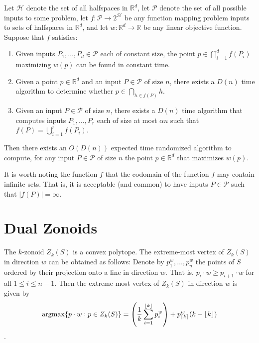 \documentclass[lotsofwhite]{patmorin}
\newcommand{\argmax}{\mathrm{argmax}}
\begin{document}
\begin{thm}[Chan 2004]
Let $\mathcal{H}$ denote the set of all halfspaces in $\mathbb{R}^d$,
let $\mathcal{P}$ denote the set of all possible inputs to some problem, 
let $f:\mathcal{P}\rightarrow 2^{\mathcal{H}}$ be any function mapping 
problem inputs to sets of halfspaces in $\mathbb{R}^d$,
and let $w:\mathbb{R}^d\rightarrow \mathbb{R}$ be
any linear objective function.  Suppose that $f$ satisfies:
\begin{enumerate}

\item Given inputs $P_1,\ldots,P_d\in\mathcal{P}$ each of constant
size, the point $p\in\bigcap_{i=1}^d f(P_i)$ maximizing $w(p)$ can be
found in constant time.

\item Given a point $p\in\mathbb{R}^d$ and an input $P\in\mathcal{P}$
of size $n$, there exists a $D(n)$ time algorithm to determine whether
$p\in\bigcap_{h\in f(P)} h$.

\item Given an input $P\in\mathcal{P}$ of size $n$, there exists a
$D(n)$ time algorithm that computes inputs $P_1,\ldots,P_r$ each of
size at most $\alpha n$ such that $f(P) = \bigcup_{i=1}^r f(P_i)$.

\end{enumerate}
Then there exists an $O(D(n))$ expected time randomized algorithm to
compute, for any input $P\in\mathcal{P}$ of size $n$ the point
$p\in\mathbb{R}^d$ that maximizes $w(p)$.
\end{thm}

It is worth noting the function $f$ that the codomain of the function
$f$ may contain infinite sets.  That is, it is acceptable (and common)
to have inputs $P\in\mathcal{P}$ such that $|f(P)|=\infty$.


\section{Dual Zonoids}

The $k$-zonoid $Z_k(S)$ is a convex polytope.  The extreme-most vertex
of $Z_k(S)$ in direction $w$ can be obtained as follows:  Denote by
$p_1^w,\ldots,p_n^w$ the points of $S$ ordered by their projection
onto a line in direction $w$.  That is, $p_i\cdot w \ge p_{i+1}\cdot
w$ for all $1\le i\le n-1$.  Then the extreme-most vertex of $Z_k(S)$
in direction $w$ is given by 
\[  
   \argmax\{p\cdot w: p\in Z_k(S)\} =
\left(\frac{1}{k}\sum_{i=1}^{\floor{k}} p_i^w\right) +
          p_{\ceil{k}}^w(k-\floor{k})
\]
\cite{beXX,gmXX}.
\end{document}

